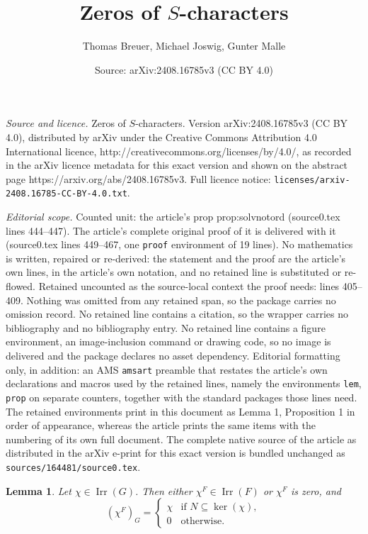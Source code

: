 \documentclass[10pt,a4paper]{amsart}
\title{Zeros of $S$-characters}
\author{Thomas Breuer, Michael Joswig, Gunter Malle}
\date{Source: arXiv:2408.16785v3 (CC BY 4.0)}
\newtheorem{lem}{Lemma}
\newcommand{\Irr}{{\operatorname{Irr}}}
\begin{document}
\maketitle

\noindent\emph{Source and licence.} Zeros of $S$-characters. Version arXiv:2408.16785v3 (CC BY 4.0), distributed by arXiv under the Creative Commons Attribution 4.0 International licence, http://creativecommons.org/licenses/by/4.0/, as recorded in the arXiv licence metadata for this exact version and shown on the abstract page https://arxiv.org/abs/2408.16785v3. Full licence notice: \texttt{licenses/arxiv-2408.16785-CC-BY-4.0.txt}.\par\smallskip

\noindent\textit{Editorial scope.} Counted unit: the article's prop prop:solvnotord (source0.tex lines 444--447). The article's complete original proof of it is delivered with it (source0.tex lines 449--467, one \texttt{proof} environment of 19 lines). No mathematics is written, repaired or re-derived: the statement and the proof are the article's own lines, in the article's own notation, and no retained line is substituted or re-flowed.  Retained uncounted as the source-local context the proof needs: lines 405--409.  Nothing was omitted from any retained span, so the package carries no omission record.  No retained line contains a citation, so the wrapper carries no bibliography and no bibliography entry.  No retained line contains a figure environment, an image-inclusion command or drawing code, so no image is delivered and the package declares no asset dependency.  Editorial formatting only, in addition: an AMS \texttt{amsart} preamble that restates the article's own declarations and macros used by the retained lines, namely the environments \texttt{lem}, \texttt{prop} on separate counters, together with the standard packages those lines need.  The retained environments print in this document as Lemma 1, Proposition 1 in order of appearance, whereas the article prints the same items with the numbering of its own full document.  The complete native source of the article as distributed in the arXiv e-print for this exact version is bundled unchanged as \texttt{sources/164481/source0.tex}.
\begin{lem}   \label{lem:proj}
 Let $\chi\in\Irr(G)$. Then either $\chi^F\in \Irr(F)$ or $\chi^F$ is zero, and
 $$(\chi^F)_G=\begin{cases} \chi& \text{if $N\subseteq \ker(\chi)$},\\
  0& \text{otherwise}.\end{cases}$$
\end{lem}
\end{document}

